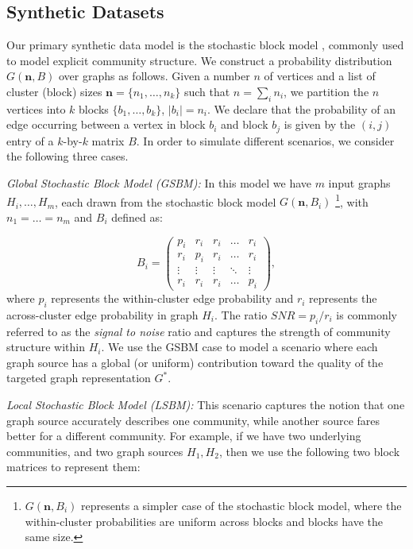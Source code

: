 \documentclass[twoside,twocolumn]{article}
\begin{document}
\subsection{Synthetic Datasets}
\label{sec:synthetic-model}

Our primary synthetic data model is the stochastic block model \cite{Wang87},
commonly used to model explicit community structure.  We construct a
probability distribution $G(\mathbf{n},B)$ over graphs as follows. Given a
number $n$ of vertices and a list of cluster (block) sizes $\mathbf{n}=\{n_1,
\dots, n_k\}$ such that $n =\sum_i n_i$, we partition the $n$ vertices into $k$
blocks $\{b_1, \dots, b_k\}$, $|b_i|=n_i$.  We declare that the probability of
an edge occurring between a vertex in block $b_i$ and block $b_j$ is given by
the $(i,j)$ entry of a $k$-by-$k$ matrix $B$. In order to simulate different
scenarios, we consider the following three cases.
 
{\em Global Stochastic Block Model (GSBM):} In this model we have $m$ input
graphs ${H_i,\ldots,H_m}$, each drawn from the stochastic block model
$G(\mathbf{n}, B_i)$ \footnote{$G(\mathbf{n}, B_i)$ represents a simpler case
of the stochastic block model, where the within-cluster probabilities are
uniform across blocks and blocks have the same size.}, with $n_1 = \dots = n_m$
and $B_i$ defined as:

\[
   B_i = 
   \begin{pmatrix}  
      p_i        &  r_i        &  r_i        & \dots  &  r_i\\
      r_i        &  p_i        &  r_i        & \dots  &  r_i \\
      \vdots     & \vdots      & \vdots      & \ddots &  \vdots      \\
      r_i        &  r_i        & r_i         & \dots  &  p_i
   \end{pmatrix},
\]
where $p_i$ represents the within-cluster edge probability and $r_i$ represents
the across-cluster edge probability in graph $H_i$. The ratio $SNR=p_i/r_i$ is
commonly referred to as the {\em signal to noise} ratio and captures the
strength of community structure within $H_i$. We use the GSBM case to model a
scenario where each graph source has a global (or uniform) contribution toward
the quality of the targeted graph representation $G^*$.

{\em Local Stochastic Block Model (LSBM):} This scenario captures the notion
that one graph source accurately describes one community, while another source
fares better for a different community. For example, if we have two underlying
communities, and two graph sources $H_1, H_2$, then we use the following two
block matrices to represent them:
\end{document}
